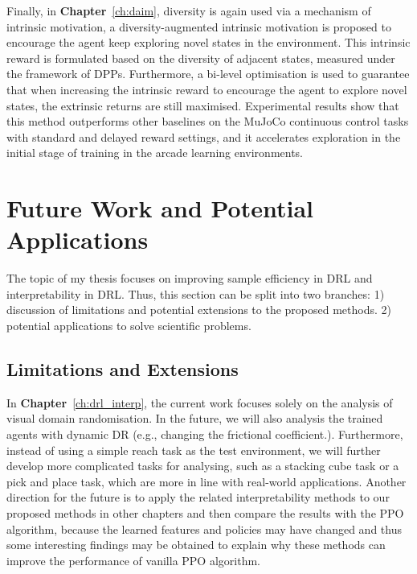 Finally, in \textbf{Chapter}~\ref{ch:daim}, diversity is again used via a mechanism of intrinsic motivation, a diversity-augmented intrinsic motivation is proposed to encourage the agent keep exploring novel states in the environment. This intrinsic reward is formulated based on the diversity of adjacent states, measured under the framework of DPPs. Furthermore, a bi-level optimisation is used to guarantee that when increasing the intrinsic reward to encourage the agent to explore novel states, the extrinsic returns are still maximised. Experimental results show that this method outperforms other baselines on the MuJoCo continuous control tasks with standard and delayed reward settings, and it accelerates exploration in the initial stage of training in the arcade learning environments. 

\section{Future Work and Potential Applications}
The topic of my thesis focuses on improving sample efficiency in DRL and interpretability in DRL. Thus, this section can be split into two branches: 1) discussion of limitations and potential extensions to the proposed methods. 2) potential applications to solve scientific problems.

\subsection{Limitations and Extensions}
In \textbf{Chapter}~\ref{ch:drl_interp}, the current work focuses solely on the analysis of visual domain randomisation. In the future, we will also analysis the trained agents with dynamic DR (e.g., changing the frictional coefficient.). Furthermore, instead of using a simple reach task as the test environment, we will further develop more complicated tasks for analysing, such as a stacking cube task or a pick and place task, which are more in line with real-world applications. Another direction for the future is to apply the related interpretability methods to our proposed methods in other chapters and then compare the results with the PPO algorithm, because the learned features and policies may have changed and thus some interesting findings may be obtained to explain why these methods can improve the performance of vanilla PPO algorithm.

